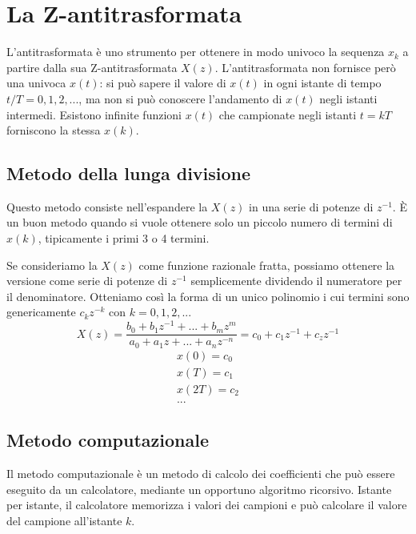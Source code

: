 \documentclass[a4paper]{report}
\begin{document}
\section{La Z-antitrasformata}
L'antitrasformata \`e uno strumento per ottenere in modo univoco la
sequenza $x_k$ a partire dalla sua Z-antitrasformata
$X(z)$. L'antitrasformata non fornisce per\`o una univoca $x(t)$: si
pu\`o sapere il valore di $x(t)$ in ogni istante di tempo $t/T = 0, 1,
2, ...$, ma non si pu\`o conoscere l'andamento di $x(t)$ negli istanti
intermedi. Esistono infinite funzioni $x(t)$ che campionate negli
istanti $t = kT$ forniscono la stessa $x(k)$.

\subsection{Metodo della lunga divisione}
Questo metodo consiste nell'espandere la $X(z)$ in una serie di
potenze di $z^{-1}$. \`E un buon metodo quando si vuole ottenere solo
un piccolo numero di termini di $x(k)$, tipicamente i primi 3 o 4
termini.

Se consideriamo la $X(z)$ come funzione razionale fratta, possiamo
ottenere la versione come serie di potenze di $z^{-1}$ semplicemente
dividendo il numeratore per il denominatore. Otteniamo cos\`i la forma
di un unico polinomio i cui termini sono genericamente $c_k z^{-k}$
con $k = 0, 1, 2, ...$
\[
X(z) = \dfrac{b_0 + b_1 z^{-1} + ... + b_m z^{m}}{a_0 + a_1 z + ... +
  a_n z^{-n}} = c_0 + c_1z^{-1} + c_zz^{-1}
\]
\[
\begin{array}{l}
  x(0) = c_0\\
  x(T) = c_1\\
  x(2T) = c_2\\
  ...
\end{array}
\]

\subsection{Metodo computazionale}
Il metodo computazionale \`e un metodo di calcolo dei coefficienti che
pu\`o essere eseguito da un calcolatore, mediante un opportuno
algoritmo ricorsivo. Istante per istante, il calcolatore memorizza i
valori dei campioni e pu\`o calcolare il valore del campione
all'istante $k$.
\end{document}
